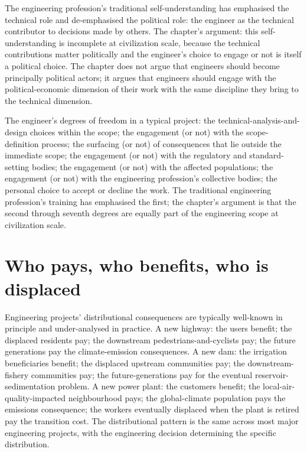 The engineering profession's traditional self-understanding has emphasised the technical role and de-emphasised the political role: the engineer as the technical contributor to decisions made by others. The chapter's argument: this self-understanding is incomplete at civilization scale, because the technical contributions matter politically and the engineer's choice to engage or not is itself a political choice. The chapter does not argue that engineers should become principally political actors; it argues that engineers should engage with the political-economic dimension of their work with the same discipline they bring to the technical dimension.

\begin{archetype}
The engineer's degrees of freedom in a typical project: the technical-analysis-and-design choices within the scope; the engagement (or not) with the scope-definition process; the surfacing (or not) of consequences that lie outside the immediate scope; the engagement (or not) with the regulatory and standard-setting bodies; the engagement (or not) with the affected populations; the engagement (or not) with the engineering profession's collective bodies; the personal choice to accept or decline the work. The traditional engineering profession's training has emphasised the first; the chapter's argument is that the second through seventh degrees are equally part of the engineering scope at civilization scale.
\end{archetype}

\section{Who pays, who benefits, who is displaced}

Engineering projects' distributional consequences are typically well-known in principle and under-analysed in practice. A new highway: the users benefit; the displaced residents pay; the downstream pedestrians-and-cyclists pay; the future generations pay the climate-emission consequences. A new dam: the irrigation beneficiaries benefit; the displaced upstream communities pay; the downstream-fishery communities pay; the future-generations pay for the eventual reservoir-sedimentation problem. A new power plant: the customers benefit; the local-air-quality-impacted neighbourhood pays; the global-climate population pays the emissions consequence; the workers eventually displaced when the plant is retired pay the transition cost. The distributional pattern is the same across most major engineering projects, with the engineering decision determining the specific distribution.

